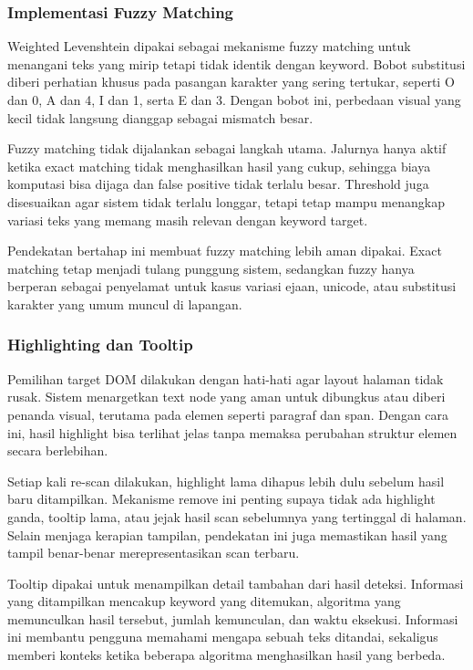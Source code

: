 \subsubsection{Implementasi Fuzzy Matching}
Weighted Levenshtein dipakai sebagai mekanisme fuzzy matching untuk menangani teks yang mirip tetapi tidak identik dengan keyword. Bobot substitusi diberi perhatian khusus pada pasangan karakter yang sering tertukar, seperti O dan 0, A dan 4, I dan 1, serta E dan 3. Dengan bobot ini, perbedaan visual yang kecil tidak langsung dianggap sebagai mismatch besar.

Fuzzy matching tidak dijalankan sebagai langkah utama. Jalurnya hanya aktif ketika exact matching tidak menghasilkan hasil yang cukup, sehingga biaya komputasi bisa dijaga dan false positive tidak terlalu besar. Threshold juga disesuaikan agar sistem tidak terlalu longgar, tetapi tetap mampu menangkap variasi teks yang memang masih relevan dengan keyword target.

Pendekatan bertahap ini membuat fuzzy matching lebih aman dipakai. Exact matching tetap menjadi tulang punggung sistem, sedangkan fuzzy hanya berperan sebagai penyelamat untuk kasus variasi ejaan, unicode, atau substitusi karakter yang umum muncul di lapangan.

\subsubsection{Highlighting dan Tooltip}
Pemilihan target DOM dilakukan dengan hati-hati agar layout halaman tidak rusak. Sistem menargetkan text node yang aman untuk dibungkus atau diberi penanda visual, terutama pada elemen seperti paragraf dan span. Dengan cara ini, hasil highlight bisa terlihat jelas tanpa memaksa perubahan struktur elemen secara berlebihan.

Setiap kali re-scan dilakukan, highlight lama dihapus lebih dulu sebelum hasil baru ditampilkan. Mekanisme remove ini penting supaya tidak ada highlight ganda, tooltip lama, atau jejak hasil scan sebelumnya yang tertinggal di halaman. Selain menjaga kerapian tampilan, pendekatan ini juga memastikan hasil yang tampil benar-benar merepresentasikan scan terbaru.

Tooltip dipakai untuk menampilkan detail tambahan dari hasil deteksi. Informasi yang ditampilkan mencakup keyword yang ditemukan, algoritma yang memunculkan hasil tersebut, jumlah kemunculan, dan waktu eksekusi. Informasi ini membantu pengguna memahami mengapa sebuah teks ditandai, sekaligus memberi konteks ketika beberapa algoritma menghasilkan hasil yang berbeda.

